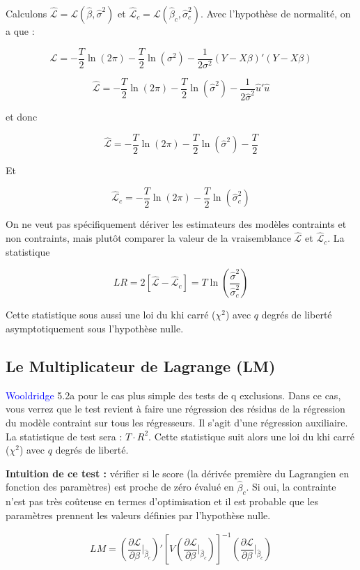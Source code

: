 \documentclass[14pt]{extarticle} %
\theoremstyle{definition}
\theoremstyle{plain}
\newcommand{\livre}[1]{\textcolor{blue}{#1}}
\begin{document}
Calculons $\hat{\mathcal{L}} = \mathcal{L}(\hat{\beta}, \hat{\sigma}^2)$ et $\hat{\mathcal{L}}_c = \mathcal{L}(\hat{\beta}_c, \hat{\sigma}_c^2)$. Avec l’hypothèse de normalité, on a que :

\[
\mathcal{L} = -\frac{T}{2} \ln(2\pi) - \frac{T}{2} \ln(\sigma^2) - \frac{1}{2\sigma^2} (Y - X\beta)'(Y - X\beta)
\]

\[
\hat{\mathcal{L}} = -\frac{T}{2} \ln(2\pi) - \frac{T}{2} \ln(\hat{\sigma}^2) - \frac{1}{2\hat{\sigma}^2} \hat{u}'\hat{u}
\]

et donc

\[
\hat{\mathcal{L}} = -\frac{T}{2} \ln(2\pi) - \frac{T}{2} \ln(\hat{\sigma}^2) - \frac{T}{2}
\]

Et

\[
\hat{\mathcal{L}}_c = -\frac{T}{2} \ln(2\pi) - \frac{T}{2} \ln(\hat{\sigma}_c^2)
\]

On ne veut pas spécifiquement dériver les estimateurs des modèles contraints et non contraints, mais plutôt comparer la valeur de la vraisemblance $\hat{\mathcal{L}}$ et $\hat{\mathcal{L}}_c$. La statistique

\[
LR = 2[\hat{\mathcal{L}} - \hat{\mathcal{L}}_c] = T \ln\left(\frac{\hat{\sigma}^2}{\hat{\sigma}_c^2}\right)
\]

Cette statistique sous aussi une loi du khi carré ($\chi^2$) avec $q$ degrés de liberté asymptotiquement sous l’hypothèse nulle.

\subsection{Le Multiplicateur de Lagrange (LM)}

\livre{Wooldridge} 5.2a pour le cas plus simple des tests de q exclusions. Dans ce cas, vous verrez que le test revient à faire une régression des résidus de la régression du modèle contraint sur tous les régresseurs. Il s’agit d’une régression auxiliaire. La statistique de test sera : $T \cdot R^2$. Cette statistique suit alors une loi du khi carré ($\chi^2$) avec $q$ degrés de liberté.

\textbf{Intuition de ce test :} vérifier si le score (la dérivée première du Lagrangien en fonction des paramètres) est proche de zéro évalué en $\hat{\beta}_c$. Si oui, la contrainte n’est pas très coûteuse en termes d’optimisation et il est probable que les paramètres prennent les valeurs définies par l’hypothèse nulle.

\[
LM = \left(\frac{\partial \mathcal{L}}{\partial \beta}\bigg|_{\hat{\beta}_c}\right)' \left[V\left(\frac{\partial \mathcal{L}}{\partial \beta}\bigg|_{\hat{\beta}_c}\right)\right]^{-1} \left(\frac{\partial \mathcal{L}}{\partial \beta}\bigg|_{\hat{\beta}_c}\right)
\]
\end{document}
